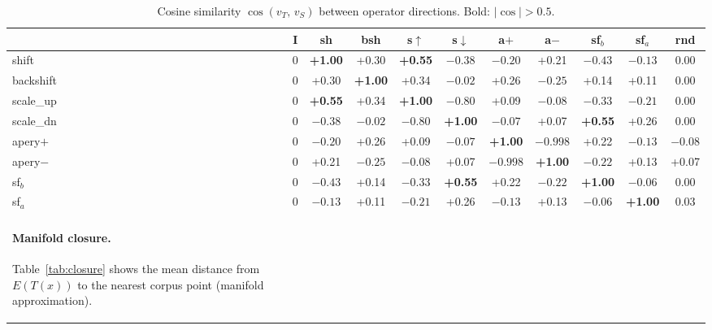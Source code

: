\documentclass[11pt,a4paper]{article}
\begin{document}
\begin{table}[h]
\centering
\caption{Cosine similarity $\cos(v_T,\, v_S)$ between operator directions.
Bold: $|\cos| > 0.5$.}
\label{tab:cosine}
\footnotesize
\setlength{\tabcolsep}{4pt}
\begin{tabular}{l|cccccccccc}
\toprule
 & I & sh & bsh & s$\uparrow$ & s$\downarrow$ & a$+$ & a$-$ & sf$_b$ & sf$_a$ & rnd \\
\midrule
shift      & 0 & \textbf{+1.00} & +0.30 & \textbf{+0.55} & $-0.38$ & $-0.20$ & +0.21 & $-0.43$ & $-0.13$ & 0.00 \\
backshift  & 0 & +0.30 & \textbf{+1.00} & +0.34 & $-0.02$ & +0.26 & $-0.25$ & +0.14 & +0.11 & 0.00 \\
scale\_up  & 0 & \textbf{+0.55} & +0.34 & \textbf{+1.00} & \textbf{$-0.80$} & +0.09 & $-0.08$ & $-0.33$ & $-0.21$ & 0.00 \\
scale\_dn  & 0 & $-0.38$ & $-0.02$ & \textbf{$-0.80$} & \textbf{+1.00} & $-0.07$ & +0.07 & \textbf{+0.55} & +0.26 & 0.00 \\
apery$+$   & 0 & $-0.20$ & +0.26 & +0.09 & $-0.07$ & \textbf{+1.00} & \textbf{$-0.998$} & +0.22 & $-0.13$ & $-0.08$ \\
apery$-$   & 0 & +0.21 & $-0.25$ & $-0.08$ & +0.07 & \textbf{$-0.998$} & \textbf{+1.00} & $-0.22$ & +0.13 & +0.07 \\
sf$_b$     & 0 & $-0.43$ & +0.14 & $-0.33$ & \textbf{+0.55} & +0.22 & $-0.22$ & \textbf{+1.00} & $-0.06$ & 0.00 \\
sf$_a$     & 0 & $-0.13$ & +0.11 & $-0.21$ & +0.26 & $-0.13$ & +0.13 & $-0.06$ & \textbf{+1.00} & 0.03 \\

\paragraph{Manifold closure.}
Table~\ref{tab:closure} shows the mean distance from $E(T(x))$ to the nearest
corpus point (manifold approximation).


\end{tabular}
\end{table}
\end{document}
